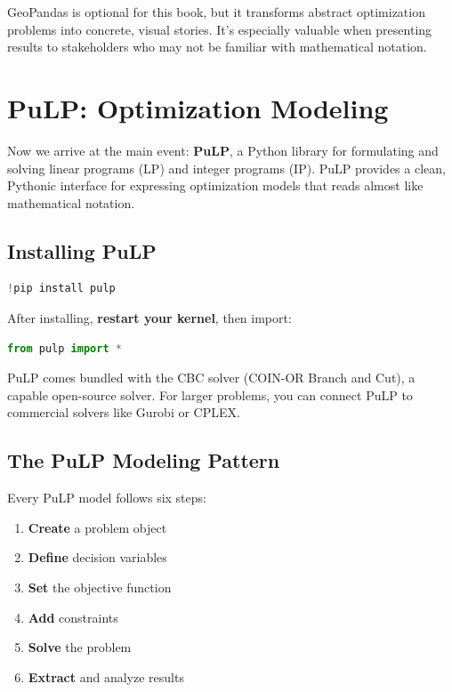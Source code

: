 \begin{info}
GeoPandas is optional for this book, but it transforms abstract optimization problems into concrete, visual stories. It's especially valuable when presenting results to stakeholders who may not be familiar with mathematical notation.
\end{info}

\section{PuLP: Optimization Modeling}

Now we arrive at the main event: \textbf{PuLP}, a Python library for formulating and solving linear programs (LP) and integer programs (IP). PuLP provides a clean, Pythonic interface for expressing optimization models that reads almost like mathematical notation.

\subsection{Installing PuLP}

\begin{lstlisting}[language=Python]
!pip install pulp
\end{lstlisting}

After installing, \textbf{restart your kernel}, then import:

\begin{lstlisting}[language=Python]
from pulp import *
\end{lstlisting}

PuLP comes bundled with the CBC solver (COIN-OR Branch and Cut), a capable open-source solver. For larger problems, you can connect PuLP to commercial solvers like Gurobi or CPLEX.

\subsection{The PuLP Modeling Pattern}
\label{sec:pulp-pattern}

Every PuLP model follows six steps:

\begin{enumerate}
\item \textbf{Create} a problem object
\item \textbf{Define} decision variables
\item \textbf{Set} the objective function
\item \textbf{Add} constraints
\item \textbf{Solve} the problem
\item \textbf{Extract} and analyze results
\end{enumerate}

